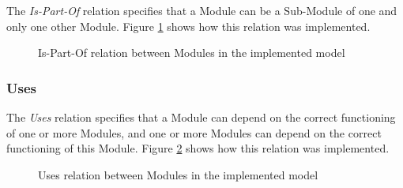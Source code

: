 The \textit{Is-Part-Of} relation specifies that a Module can be a Sub-Module of one and only one other Module. Figure \ref{figure:modelIsPartOfRelation} shows how this relation was implemented.

\begin{figure}[h]
\centering
\renewcommand {\umltextcolor}{black}
\renewcommand {\umlfillcolor}{none}
\renewcommand {\umldrawcolor}{black}
\caption{Is-Part-Of relation between Modules in the implemented model}
\label{figure:modelIsPartOfRelation}
\end{figure}

\subsubsection{Uses}

The \textit{Uses} relation specifies that a Module can depend on the correct functioning of one or more Modules, and one or more Modules can depend on the correct functioning of this Module. Figure \ref{figure:modelUsesRelation} shows how this relation was implemented.

\begin{figure}[h]
\centering
\renewcommand {\umltextcolor}{black}
\renewcommand {\umlfillcolor}{none}
\renewcommand {\umldrawcolor}{black}
\caption{Uses relation between Modules in the implemented model}

\label{figure:modelUsesRelation}
\end{figure}

